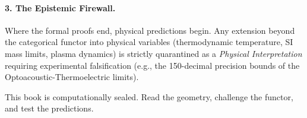 \paragraph{3. The Epistemic Firewall.}
Where the formal proofs end, physical predictions begin. Any extension beyond the categorical functor into physical variables (thermodynamic temperature, SI mass limits, plasma dynamics) is strictly quarantined as a \emph{Physical Interpretation} requiring experimental falsification (e.g., the 150-decimal precision bounds of the Optoacoustic-Thermoelectric limits). 

This book is computationally sealed. Read the geometry, challenge the functor, and test the predictions.
